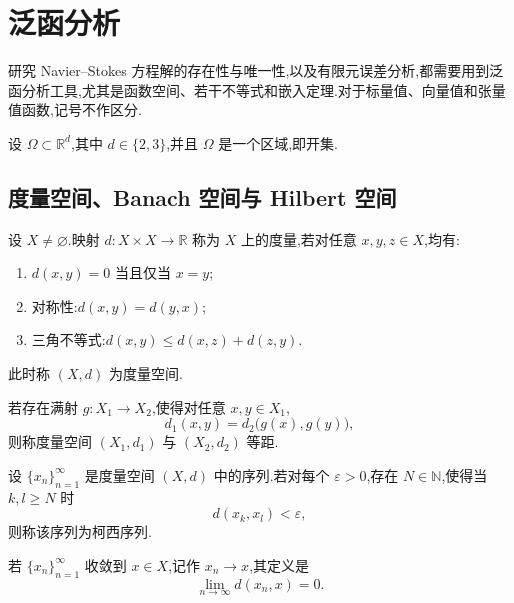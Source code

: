 \chapter{泛函分析}\label{app:functional-analysis}

\begin{note}[动机]\label{note:appendix-a-1}
研究 Navier--Stokes 方程解的存在性与唯一性,以及有限元误差分析,都需要用到泛函分析工具,尤其是函数空间、若干不等式和嵌入定理.对于标量值、向量值和张量值函数,记号不作区分.

设 $\Omega\subset\mathbb R^d$,其中 $d\in\{2,3\}$,并且 $\Omega$ 是一个区域,即开集.
\end{note}

\section{度量空间、Banach 空间与 Hilbert 空间}\label{sec:appendix-a-metric-banach-hilbert}

\begin{definition}[度量空间]\label{def:appendix-a-2}
设 $X\ne\varnothing$.映射 $d:X\times X\to\mathbb R$ 称为 $X$ 上的度量,若对任意 $x,y,z\in X$,均有:
\begin{enumerate}[label=(\roman*)]
  \item $d(x,y)=0$ 当且仅当 $x=y$;
  \item 对称性:$d(x,y)=d(y,x)$;
  \item 三角不等式:$d(x,y)\le d(x,z)+d(z,y)$.
\end{enumerate}
此时称 $(X,d)$ 为度量空间.
\end{definition}

\begin{definition}[等距的度量空间]\label{def:appendix-a-3}
若存在满射 $g:X_1\to X_2$,使得对任意 $x,y\in X_1$,
\[
 d_1(x,y)=d_2\bigl(g(x),g(y)\bigr),
\]
则称度量空间 $(X_1,d_1)$ 与 $(X_2,d_2)$ 等距.
\end{definition}

\begin{definition}[柯西序列与收敛序列]\label{def:appendix-a-4}
设 $\{x_n\}_{n=1}^{\infty}$ 是度量空间 $(X,d)$ 中的序列.若对每个 $\varepsilon>0$,存在 $N\in\mathbb N$,使得当 $k,l\ge N$ 时
\[
 d(x_k,x_l)<\varepsilon,
\]
则称该序列为柯西序列.

若 $\{x_n\}_{n=1}^{\infty}$ 收敛到 $x\in X$,记作 $x_n\to x$,其定义是
\[
 \lim_{n\to\infty}d(x_n,x)=0.
\]
\end{definition}

